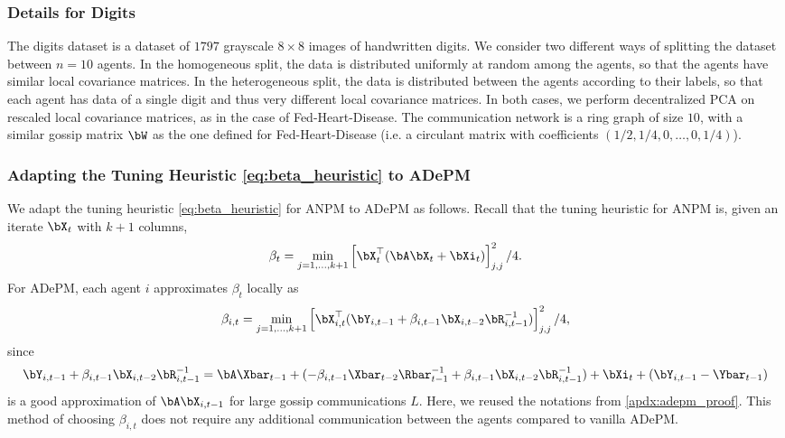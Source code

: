 \documentclass{article}
\theoremstyle{plain}
\theoremstyle{definition}
\theoremstyle{remark}
\begin{document}
\subsubsection{Details for Digits}

The digits dataset \cite{alpaydin1998} is a dataset of $1797$ grayscale $8 \times 8$ images of handwritten digits. We consider two different ways of splitting the dataset between $n=10$ agents. In the homogeneous split, the data is distributed uniformly at random among the agents, so that the agents have similar local covariance matrices. In the heterogeneous split, the data is distributed between the agents according to their labels, so that each agent has data of a single digit and thus very different local covariance matrices. In both cases, we perform decentralized PCA on rescaled local covariance matrices, as in the case of Fed-Heart-Disease. The communication network is a ring graph of size $10$, with a similar gossip matrix $\bW$ as the one defined for Fed-Heart-Disease (i.e. a circulant matrix with coefficients $(1/2, 1/4, 0 , \dots, 0, 1/4)$). 



\subsubsection{Adapting the Tuning Heuristic \eqref{eq:beta_heuristic} to ADePM}

We adapt the tuning heuristic \eqref{eq:beta_heuristic} for ANPM to ADePM as follows. Recall that the tuning heuristic for ANPM is, given an iterate $\bX_t$ with $k+1$ columns, 
\begin{align*}
  \beta_t = \min_{j=1,\dots,k+1} \left[ \bX_t^\top(\bA\bX_t + \bXi_t)\right]_{j,j}^2/4.
\end{align*}
For ADePM, each agent $i$ approximates $\beta_t$ locally as
\begin{align*}
  \beta_{i,t} = \min_{j=1,\dots,k+1} \left[ \bX_{i,t}^\top(\bY_{i,t-1} + \beta_{i,t-1}\bX_{i,t-2}\bR_{i,t-1}^{-1})\right]_{j,j}^2/4,
\end{align*}
since 
\begin{align*}
  \bY_{i,t-1} + \beta_{i,t-1}\bX_{i,t-2}\bR_{i,t-1}^{-1} = \bA\Xbar_{t-1} + (- \beta_{i,t-1}\Xbar_{t-2}\Rbar_{t-1}^{-1} + \beta_{i,t-1}\bX_{i,t-2}\bR_{i,t-1}^{-1}) + \bXi_t + (\bY_{i,t-1} - \Ybar_{t-1})
\end{align*}
is a good approximation of $\bA\bX_{i,t-1}$ for large gossip communications $L$. Here, we reused the notations from \cref{apdx:adepm_proof}. This method of choosing $\beta_{i,t}$ does not require any additional communication between the agents compared to vanilla ADePM.

\end{document}
